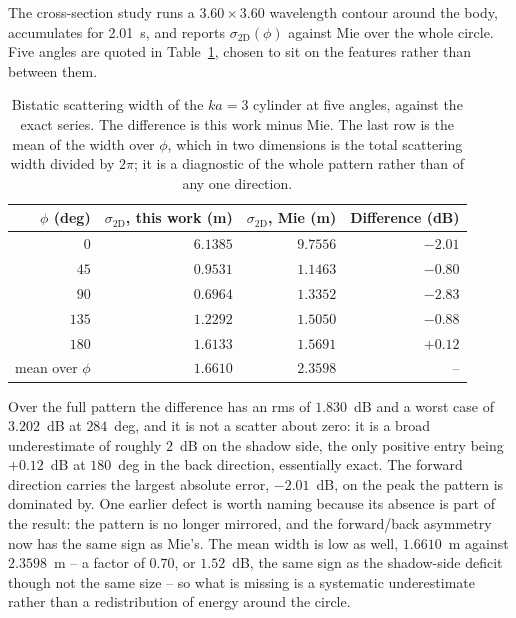 The cross-section study runs a $3.60\times3.60$ wavelength contour around the body, accumulates for
\SI{2.01}{s}, and reports $\sigma_{2\mathrm{D}}(\phi)$ against Mie over the whole circle. Five angles are
quoted in Table~\ref{tab:rcs}, chosen to sit on the features rather than between them.

\begin{table}[H]
  \centering
  \begin{tabular}{rrrr}
    \toprule
    $\phi$ (deg) & $\sigma_{2\mathrm{D}}$, this work (m) & $\sigma_{2\mathrm{D}}$, Mie (m) & Difference (dB) \\
    \midrule
    $0$   & $6.1385$ & $9.7556$ & $-2.01$ \\
    $45$  & $0.9531$ & $1.1463$ & $-0.80$ \\
    $90$  & $0.6964$ & $1.3352$ & $-2.83$ \\
    $135$ & $1.2292$ & $1.5050$ & $-0.88$ \\
    $180$ & $1.6133$ & $1.5691$ & $+0.12$ \\
    \midrule
    mean over $\phi$ & $1.6610$ & $2.3598$ & -- \\
    \bottomrule
  \end{tabular}
  \caption{Bistatic scattering width of the $ka=3$ cylinder at five angles, against the exact series. The
  difference is this work minus Mie. The last row is the mean of the width over $\phi$, which in two
  dimensions is the total scattering width divided by $2\pi$; it is a diagnostic of the whole pattern rather
  than of any one direction.}
  \label{tab:rcs}
\end{table}

Over the full pattern the difference has an rms of $1.830$~dB and a worst case of $3.202$~dB at $284$~deg,
and it is not a scatter about zero: it is a broad underestimate of roughly $2$~dB on the shadow side, the
only positive entry being $+0.12$~dB at $180$~deg in the back direction, essentially exact. The forward
direction carries the largest absolute error, $-2.01$~dB, on the peak the pattern is dominated by. One earlier
defect is worth naming because its absence is part of the result: the pattern is no longer mirrored, and the
forward/back asymmetry now has the same sign as Mie's. The mean width is low as well, $1.6610$~m against
$2.3598$~m -- a factor of $0.70$, or $1.52$~dB, the same sign as the shadow-side deficit though not the same
size -- so what is missing is a systematic underestimate rather than a redistribution of energy around the
circle.

